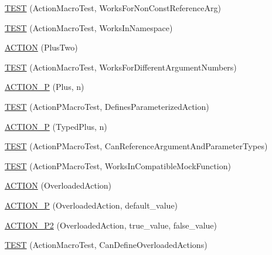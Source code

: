 \begin{DoxyCompactItemize}
\item 
\hyperlink{namespacetesting_1_1gmock__generated__actions__test_a093a824ac7e8ec775a8f5d7b11d223a9}{T\+E\+ST} (Action\+Macro\+Test, Works\+For\+Non\+Const\+Reference\+Arg)
\item 
\hyperlink{namespacetesting_1_1gmock__generated__actions__test_af75a9a5b9d6a1cf718a58f030a5a9133}{T\+E\+ST} (Action\+Macro\+Test, Works\+In\+Namespace)
\item 
\hyperlink{namespacetesting_1_1gmock__generated__actions__test_a0eef2f885ccb1e4fac88a910f0fc5c2e}{A\+C\+T\+I\+ON} (Plus\+Two)
\item 
\hyperlink{namespacetesting_1_1gmock__generated__actions__test_acb98f6208678d9f5500a0c2c095b8cd0}{T\+E\+ST} (Action\+Macro\+Test, Works\+For\+Different\+Argument\+Numbers)
\item 
\hyperlink{namespacetesting_1_1gmock__generated__actions__test_ac081154b3ae2f099bd5be853cacfdaa4}{A\+C\+T\+I\+O\+N\+\_\+P} (Plus, n)
\item 
\hyperlink{namespacetesting_1_1gmock__generated__actions__test_a42a5fe606ca18b2eb1e5d7884045118f}{T\+E\+ST} (Action\+P\+Macro\+Test, Defines\+Parameterized\+Action)
\item 
\hyperlink{namespacetesting_1_1gmock__generated__actions__test_a3bcd440e11ab64ad5eb007efce33cf7d}{A\+C\+T\+I\+O\+N\+\_\+P} (Typed\+Plus, n)
\item 
\hyperlink{namespacetesting_1_1gmock__generated__actions__test_a4262c10efb367abf9771b3060c57d190}{T\+E\+ST} (Action\+P\+Macro\+Test, Can\+Reference\+Argument\+And\+Parameter\+Types)
\item 
\hyperlink{namespacetesting_1_1gmock__generated__actions__test_ab545244777c7559d1b0c2c63ee2be134}{T\+E\+ST} (Action\+P\+Macro\+Test, Works\+In\+Compatible\+Mock\+Function)
\item 
\hyperlink{namespacetesting_1_1gmock__generated__actions__test_a24927d97882dc1d52e203720df804188}{A\+C\+T\+I\+ON} (Overloaded\+Action)
\item 
\hyperlink{namespacetesting_1_1gmock__generated__actions__test_a1ee92e8b8bd6a5a54f5d2fcdb9f122b8}{A\+C\+T\+I\+O\+N\+\_\+P} (Overloaded\+Action, default\+\_\+value)
\item 
\hyperlink{namespacetesting_1_1gmock__generated__actions__test_a233ee874462c7956e154945975da1127}{A\+C\+T\+I\+O\+N\+\_\+\+P2} (Overloaded\+Action, true\+\_\+value, false\+\_\+value)
\item 
\hyperlink{namespacetesting_1_1gmock__generated__actions__test_a8a3d26365bdae172067fe3a63bd88e85}{T\+E\+ST} (Action\+Macro\+Test, Can\+Define\+Overloaded\+Actions)

\end{DoxyCompactItemize}
